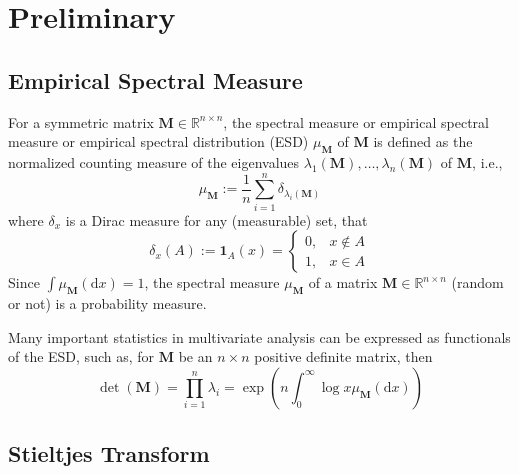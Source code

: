 \chapter{Preliminary}

\section{Empirical Spectral Measure}

\begin{definition}
    For a symmetric matrix $\mathbf{M}\in\mathbb{R}^{n\times n}$, the spectral measure or empirical spectral measure or empirical spectral distribution (ESD) $\mu_{\mathbf{M}}$ of $\mathbf{M}$ is defined as the normalized counting measure of the eigenvalues $\lambda_{1}(\mathbf{M}),\ldots,\lambda_{n}(\mathbf{M})$ of $\mathbf{M}$, i.e.,
    \begin{equation}
        \mu_{\mathbf{M}}:=\frac{1}{n}\sum_{i=1}^{n}\delta_{\lambda_{i}(\mathbf{M})}
    \end{equation}
    where $\delta_{x}$ is a Dirac measure for any (measurable) set, that
    \begin{equation*}
        \delta_{x}(A):=\mathbf{1}_{A}(x)=
        \begin{cases}
            0, & x\notin A \\
            1, & x\in A
        \end{cases}
    \end{equation*}
    Since $\int\mu_{\mathbf{M}}\left(\mathrm{d}x\right)=1$, the spectral measure $\mu_{\mathbf{M}}$ of a matrix $\mathbf{M}\in\mathbb{R}^{n\times n}$ (random or not) is a probability measure.
\end{definition}

\begin{remark}
    Many important statistics in multivariate analysis can be expressed as functionals of the ESD, such as, for $\mathbf{M}$ be an $n\times n$ positive definite matrix, then
    \begin{equation}
        \operatorname{det}(\mathbf{M})=\prod_{i=1}^{n}\lambda_{i}=\exp\left(n\int_{0}^{\infty}\log x\mu_{\mathbf{M}}(\mathrm{d}x)\right)
    \end{equation}
\end{remark}

\section{Stieltjes Transform}

